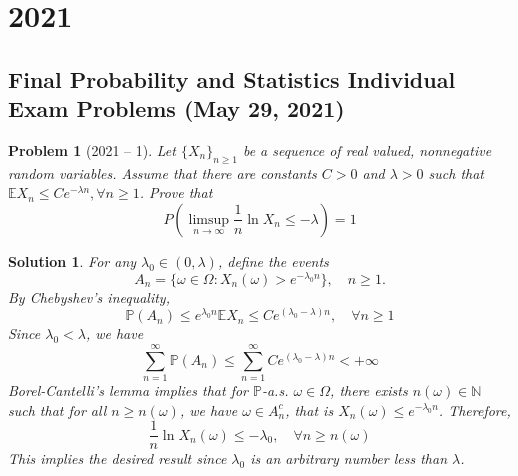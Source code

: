 \documentclass[12pt]{amsart}
\newtheorem{problem}{Problem}
\newtheorem*{solution}{Solution}
\begin{document}
\section*{2021}
\subsection*{Final Probability and Statistics Individual Exam Problems (May 29, 2021)}

\begin{problem}[2021 -- 1]
Let $\{X_n\}_{n \geq 1}$ be a sequence of real valued, nonnegative random variables.
Assume that there are constants $C>0$ and $\lambda>0$ such that $\mathbb{E} X_n \leq C e^{-\lambda n}, \forall n \geq 1$.
Prove that
$$
P(\limsup _{n \rightarrow \infty} \frac{1}{n} \ln X_n \leq-\lambda)=1
$$
\end{problem}
\begin{solution}
For any $\lambda_0 \in(0, \lambda)$, define the events
$$
A_n=\{\omega \in \Omega: X_n(\omega)>e^{-\lambda_0 n}\}, \quad n \geq 1 .
$$
By Chebyshev's inequality,
$$
\mathbb{P}(A_n) \leq e^{\lambda_0 n} \mathbb{E} X_n \leq C e^{(\lambda_0-\lambda) n}, \quad \forall n \geq 1
$$
Since $\lambda_0<\lambda$, we have
$$
\sum_{n=1}^{\infty} \mathbb{P}(A_n) \leq \sum_{n=1}^{\infty} C e^{(\lambda_0-\lambda) n}<+\infty
$$
Borel-Cantelli's lemma implies that for $\mathbb{P}$-a.s. $\omega \in \Omega$, there exists $n(\omega) \in \mathbb{N}$ such that for all $n \geq n(\omega)$, we have $\omega \in A_n^c$, that is $X_n(\omega) \leq e^{-\lambda_0 n}$. Therefore,
$$
\frac{1}{n} \ln X_n(\omega) \leq-\lambda_0, \quad \forall n \geq n(\omega)
$$
This implies the desired result since $\lambda_0$ is an arbitrary number less than $\lambda$.
\end{solution}
\end{document}

